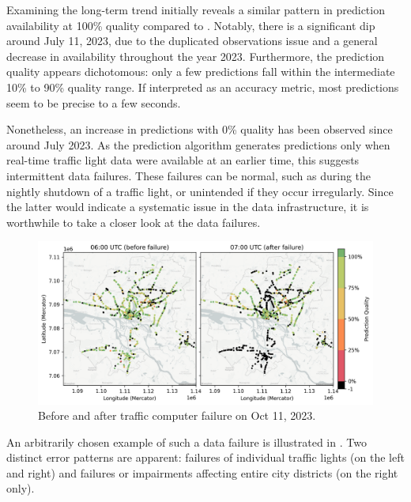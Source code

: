 Examining the long-term trend initially reveals a similar pattern in prediction availability at 100\% quality compared to . Notably, there is a significant dip around July 11, 2023, due to the duplicated observations issue and a general decrease in availability throughout the year 2023. Furthermore, the prediction quality appears dichotomous: only a few predictions fall within the intermediate 10\% to 90\% quality range. If interpreted as an accuracy metric, most predictions seem to be precise to a few seconds. 

Nonetheless, an increase in predictions with 0\% quality has been observed since around July 2023. As the prediction algorithm generates predictions only when real-time traffic light data were available at an earlier time, this suggests intermittent data failures. These failures can be normal, such as during the nightly shutdown of a traffic light, or unintended if they occur irregularly. Since the latter would indicate a systematic issue in the data infrastructure, it is worthwhile to take a closer look at the data failures.

\begin{figure}[t]
    \centering
    \includegraphics[width=\linewidth]{images/monitoring-before-after-failure.png}
    \caption{Before and after traffic computer failure on Oct 11, 2023.}\label{fig:monitoring-failure}
\end{figure}

An arbitrarily chosen example of such a data failure is illustrated in . Two distinct error patterns are apparent: failures of individual traffic lights (on the left and right) and failures or impairments affecting entire city districts (on the right only).

